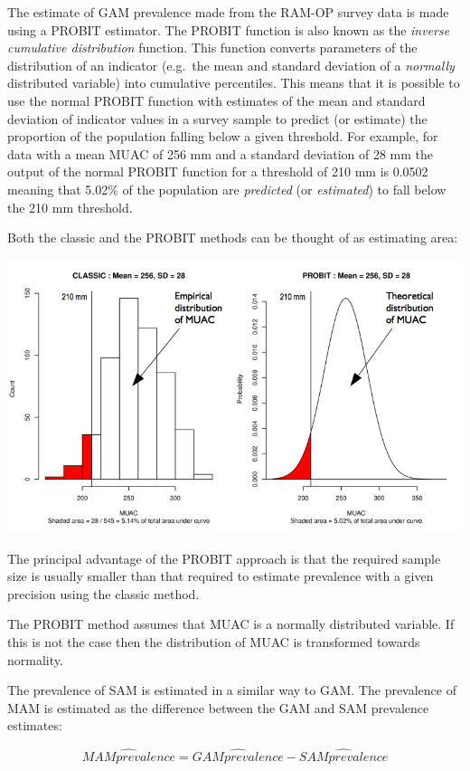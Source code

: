 \documentclass[12pt,a4paper]{book}
\theoremstyle{definition}
\theoremstyle{definition}
\theoremstyle{definition}
\theoremstyle{remark}
\begin{document}
The estimate of GAM prevalence made from the RAM-OP survey data is made
using a PROBIT estimator. The PROBIT function is also known as the
\emph{inverse cumulative distribution} function. This function converts
parameters of the distribution of an indicator (e.g.~the mean and
standard deviation of a \emph{normally} distributed variable) into
cumulative percentiles. This means that it is possible to use the normal
PROBIT function with estimates of the mean and standard deviation of
indicator values in a survey sample to predict (or estimate) the
proportion of the population falling below a given threshold. For
example, for data with a mean MUAC of 256 mm and a standard deviation of
28 mm the output of the normal PROBIT function for a threshold of 210 mm
is 0.0502 meaning that 5.02\% of the population are \emph{predicted} (or
\emph{estimated}) to fall below the 210 mm threshold.

Both the classic and the PROBIT methods can be thought of as estimating
area:

\includegraphics{figures/indicators26.png}

The principal advantage of the PROBIT approach is that the required
sample size is usually smaller than that required to estimate prevalence
with a given precision using the classic method.

The PROBIT method assumes that MUAC is a normally distributed variable.
If this is not the case then the distribution of MUAC is transformed
towards normality.

The prevalence of SAM is estimated in a similar way to GAM. The
prevalence of MAM is estimated as the difference between the GAM and SAM
prevalence estimates:

\[\widehat{MAM prevalence} = \widehat{GAM prevalence} - \widehat{SAM prevalence}\]
\end{document}
